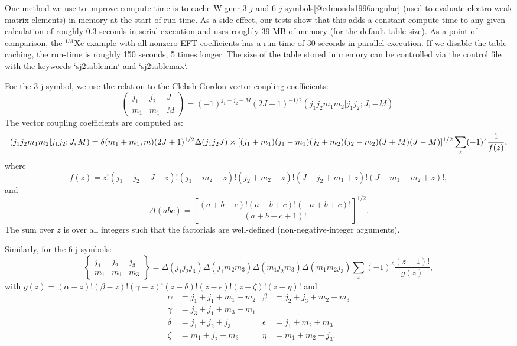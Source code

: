 One method we use to improve  compute time  is to cache Wigner 3-$j$ and 6-$j$
symbols[@edmonds1996angular] (used to evaluate electro-weak matrix
elements) in memory at the start of run-time. As a side effect, our tests show
that this adds a constant compute time to any given calculation of roughly 0.3
seconds in serial execution and uses roughly 39 MB of memory (for the default
table size). As a point of comparison, the $^{131}$Xe example with all-nonzero
EFT coefficients has a run-time of 30 seconds in parallel execution. If we
disable the table caching, the run-time is roughly 150 seconds, 5 times longer.
The size of the table stored in memory can be controlled via the control file
with the keywords `sj2tablemin` and `sj2tablemax`.

For the 3-j symbol, we use the relation to the Clebsh-Gordon vector-coupling
coefficients:
\begin{equation}
    \begin{pmatrix}
        j_1 & j_2 & J\\
        m_1 & m_1 & M
    \end{pmatrix}
    = (-1)^{j_1-j_2-M}(2J+1)^{-1/2}
    (j_1j_2m_1m_2 | j_1 j_2; J, -M).
\end{equation}
The vector coupling coefficients are computed as:
\begin{equation}
    (j_1j_2  m_1m_2 | j_1 j_2; J, M) = \delta(m_1+m_1,m) (2J+1)^{1/2}\Delta(j_1j_2J)\\
     \times[(j_1+m_1)(j_1-m_1)(j_2+m_2)(j_2-m_2)(J+M)(J-M)]^{1/2}\sum_z (-1)^z \frac{1}{f(z)},
\end{equation}
where
\begin{equation}
    f(z) = z!(j_1+j_2-J-z)!(j_1-m_2-z)!
    (j_2+m_2-z)!(J-j_2+m_1+z)!(J-m_1-m_2+z)!,
\end{equation}
and
\begin{equation}
    \Delta(abc) = \left[\frac{(a+b-c)!(a-b+c)!(-a+b+c)!}{(a+b+c+1)!} \right]^{1/2}.
\end{equation}
The sum over $z$ is over all integers such that the factorials are well-defined
(non-negative-integer arguments).

Similarly, for the 6-j symbols:
\begin{equation}
    \begin{Bmatrix}
        j_1 & j_2 & j_3\\
        m_1 & m_1 & m_3
    \end{Bmatrix}
    = \Delta(j_1j_2j_3)\Delta(j_1m_2m_3)\Delta(m_1j_2m_3)
     \Delta(m_1m_2j_3) \sum_z (-1)^z\frac{(z+1)!}{g(z)},
\end{equation}
with
$g(z) = (\alpha - z)!(\beta-z)!(\gamma-z)!(z-\delta)!(z-\epsilon)!(z-\zeta)!(z-\eta)!$ 
and
\begin{equation}
\begin{split}
    \alpha &= j_1+j_1+m_1+m_2 & \beta  &= j_2+j_3+m_2+m_3\\
    \gamma &= j_3+j_1+m_3+m_1 \\
    \delta &= j_1+j_2+j_3 & \epsilon &= j_1+m_2+m_3 \\
    \zeta &= m_1+j_2+m_3 & \eta &= m_1+m_2+j_3.
\end{split}
\end{equation}

